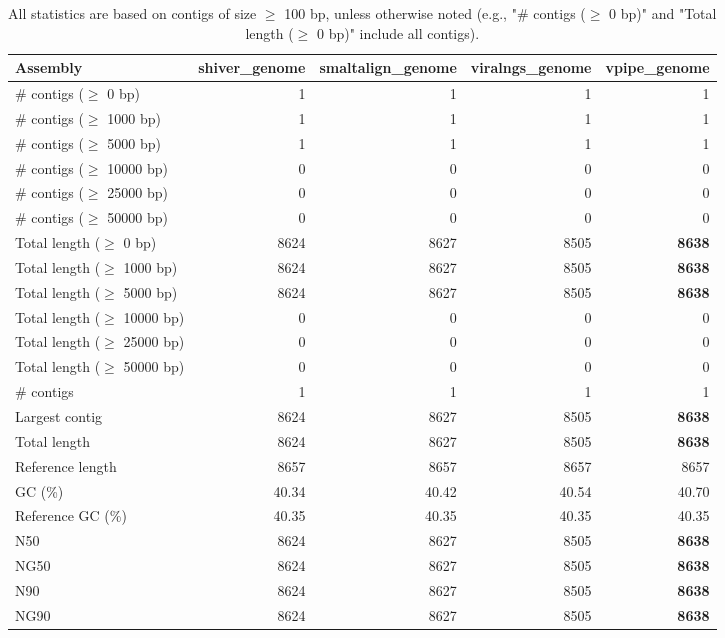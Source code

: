 \documentclass[12pt,a4paper]{article}
\begin{document}
\begin{table}[ht]
\begin{center}
\caption{All statistics are based on contigs of size $\geq$ 100 bp, unless otherwise noted (e.g., "\# contigs ($\geq$ 0 bp)" and "Total length ($\geq$ 0 bp)" include all contigs).}
\begin{tabular}{|l*{4}{|r}|}
\hline
Assembly & shiver\_genome & smaltalign\_genome & viralngs\_genome & vpipe\_genome \\ \hline
\# contigs ($\geq$ 0 bp) & 1 & 1 & 1 & 1 \\ \hline
\# contigs ($\geq$ 1000 bp) & 1 & 1 & 1 & 1 \\ \hline
\# contigs ($\geq$ 5000 bp) & 1 & 1 & 1 & 1 \\ \hline
\# contigs ($\geq$ 10000 bp) & 0 & 0 & 0 & 0 \\ \hline
\# contigs ($\geq$ 25000 bp) & 0 & 0 & 0 & 0 \\ \hline
\# contigs ($\geq$ 50000 bp) & 0 & 0 & 0 & 0 \\ \hline
Total length ($\geq$ 0 bp) & 8624 & 8627 & 8505 & {\bf 8638} \\ \hline
Total length ($\geq$ 1000 bp) & 8624 & 8627 & 8505 & {\bf 8638} \\ \hline
Total length ($\geq$ 5000 bp) & 8624 & 8627 & 8505 & {\bf 8638} \\ \hline
Total length ($\geq$ 10000 bp) & 0 & 0 & 0 & 0 \\ \hline
Total length ($\geq$ 25000 bp) & 0 & 0 & 0 & 0 \\ \hline
Total length ($\geq$ 50000 bp) & 0 & 0 & 0 & 0 \\ \hline
\# contigs & 1 & 1 & 1 & 1 \\ \hline
Largest contig & 8624 & 8627 & 8505 & {\bf 8638} \\ \hline
Total length & 8624 & 8627 & 8505 & {\bf 8638} \\ \hline
Reference length & 8657 & 8657 & 8657 & 8657 \\ \hline
GC (\%) & 40.34 & 40.42 & 40.54 & 40.70 \\ \hline
Reference GC (\%) & 40.35 & 40.35 & 40.35 & 40.35 \\ \hline
N50 & 8624 & 8627 & 8505 & {\bf 8638} \\ \hline
NG50 & 8624 & 8627 & 8505 & {\bf 8638} \\ \hline
N90 & 8624 & 8627 & 8505 & {\bf 8638} \\ \hline
NG90 & 8624 & 8627 & 8505 & {\bf 8638} \\ \hline

\end{tabular}
\end{center}
\end{table}
\end{document}
